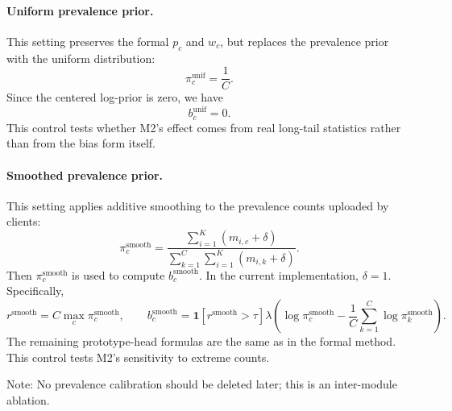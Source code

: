 \documentclass[letterpaper]{article}
\begin{document}
\paragraph{Uniform prevalence prior.}
This setting preserves the formal $p_c$ and $w_c$, but replaces the prevalence prior with the uniform distribution:
\begin{equation}
\pi_c^{\mathrm{unif}}=\frac{1}{C}.
\end{equation}
Since the centered log-prior is zero, we have
\begin{equation}
b_c^{\mathrm{unif}}=0.
\end{equation}
This control tests whether M2's effect comes from real long-tail statistics rather than from the bias form itself.

\paragraph{Smoothed prevalence prior.}
This setting applies additive smoothing to the prevalence counts uploaded by clients:
\begin{equation}
\pi_c^{\mathrm{smooth}}
=\frac{\sum_{i=1}^{K}(m_{i,c}+\delta)}
{\sum_{k=1}^{C}\sum_{i=1}^{K}(m_{i,k}+\delta)}.
\end{equation}
Then $\pi_c^{\mathrm{smooth}}$ is used to compute $b_c^{\mathrm{smooth}}$. In the current implementation, $\delta=1$. Specifically,
\begin{equation}
r^{\mathrm{smooth}}=C\max_c \pi_c^{\mathrm{smooth}},
\qquad
b_c^{\mathrm{smooth}}
=\mathbf{1}[r^{\mathrm{smooth}}>\tau]\lambda
\left(
\log \pi_c^{\mathrm{smooth}}
-\frac{1}{C}\sum_{k=1}^{C}\log \pi_k^{\mathrm{smooth}}
\right).
\end{equation}
The remaining prototype-head formulas are the same as in the formal method. This control tests M2's sensitivity to extreme counts.

Note: No prevalence calibration should be deleted later; this is an inter-module ablation.
\end{document}
